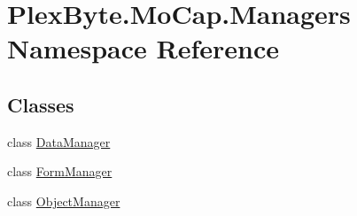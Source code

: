 \hypertarget{namespace_plex_byte_1_1_mo_cap_1_1_managers}{}\section{Plex\+Byte.\+Mo\+Cap.\+Managers Namespace Reference}
\label{namespace_plex_byte_1_1_mo_cap_1_1_managers}
\subsection*{Classes}
\begin{DoxyCompactItemize}
\item 
class \hyperlink{class_plex_byte_1_1_mo_cap_1_1_managers_1_1_data_manager}{Data\+Manager}
\item 
class \hyperlink{class_plex_byte_1_1_mo_cap_1_1_managers_1_1_form_manager}{Form\+Manager}
\item 
class \hyperlink{class_plex_byte_1_1_mo_cap_1_1_managers_1_1_object_manager}{Object\+Manager}
\end{DoxyCompactItemize}
